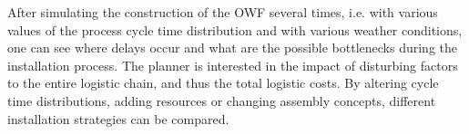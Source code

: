 After simulating the construction of the OWF several times, i.e. with various values of the process cycle time distribution and with various weather conditions, one can see where delays occur and what are the possible bottlenecks during the installation process. The planner is interested in the impact of disturbing factors to the entire logistic chain, and thus the total logistic costs. By altering cycle time distributions, adding resources or changing assembly concepts, different installation strategies can be compared.